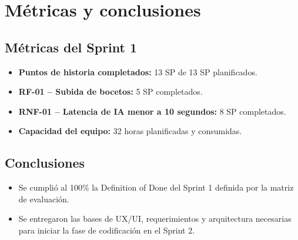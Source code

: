 \documentclass[12pt,a4paper]{article}
\begin{document}
\section{Métricas y conclusiones}

\subsection{Métricas del Sprint 1}
\begin{itemize}
    \item \textbf{Puntos de historia completados:} 13 SP de 13 SP planificados.
    \item \textbf{RF-01 -- Subida de bocetos:} 5 SP completados.
    \item \textbf{RNF-01 -- Latencia de IA menor a 10 segundos:} 8 SP completados.
    \item \textbf{Capacidad del equipo:} 32 horas planificadas y consumidas.
\end{itemize}

\subsection{Conclusiones}
\begin{itemize}
    \item Se cumplió al 100\% la Definition of Done del Sprint 1 definida por la matriz de evaluación.
    \item Se entregaron las bases de UX/UI, requerimientos y arquitectura necesarias para iniciar la fase de codificación en el Sprint 2.
\end{itemize}
\end{document}
